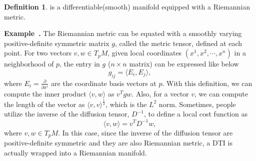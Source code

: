 \documentclass[a4paper]{article}
\theoremstyle{definition}
\newtheorem{definition}{Definition}
\theoremstyle{plain}
\newcounter{example}{Example}
\newenvironment{example}[1][]{\refstepcounter{example}\par\medskip
   \noindent \textbf{Example~\theexample. #1} \rmfamily}{\medskip}
\begin{document}
\begin{definition} 
 is a differentiable(smooth) manifold equipped with a Riemannian metric. 
\end{definition}

\begin{example}
The Riemannian metric can be equated with a smoothly varying positive-definite symmetric matrix $g$, called the metric tensor, defined at each point. For two vectors $v,w\in T_pM$, given local coordinates $(x^1, x^2,\cdots,x^n)$ in a neighborhood of $p$, the entry in $g$ ($n\times n$ matrix) can be expressed like below
\begin{equation*}
    g_{ij}=\langle E_i,E_j\rangle,
\end{equation*}
where $E_i=\frac{\partial}{\partial x^i}$ are the coordinate basis vectors at $p$. With this definition, we can compute the inner product $\langle v,w\rangle$ as $v^Tgw$. Also, for a vector $v$, we can compute the length of the vector as $\langle v,v\rangle^\frac{1}{2}$, which is the $L^2$ norm. Sometimes, people utilize the inverse of the diffusion tensor, $D^{-1}$, to define a local cost function as
\begin{equation*}
    \langle v,w\rangle=v^TD^{-1}w,
\end{equation*}
where $v, w\in T_pM$. In this case, since the inverse of the diffusion tensor are positive-definite symmetric and they are also Riemannian metric, a DTI is actually wrapped into a Riemannian manifold.
\end{example}
\end{document}
